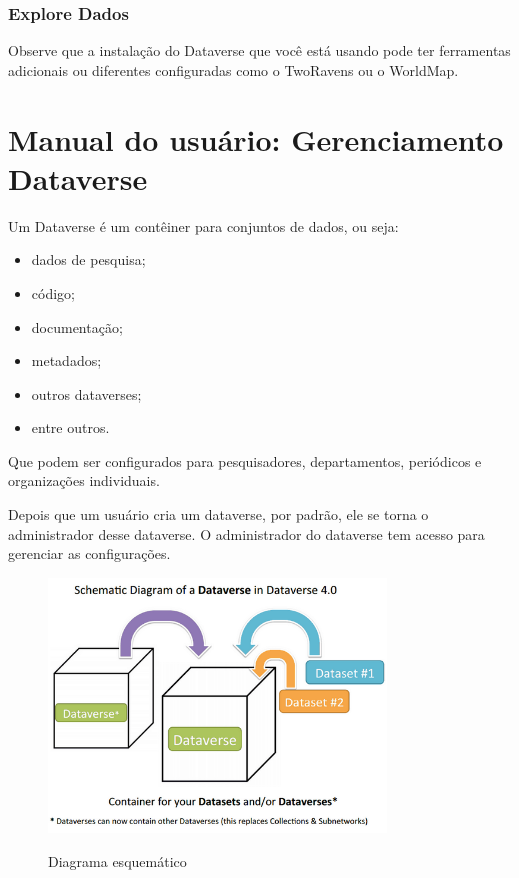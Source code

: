 \documentclass[12pt,hidelinks]{article}
\begin{document}
    	\subsubsection{Explore Dados}
	
\qquad Observe que a instalação do Dataverse que você está usando pode ter ferramentas adicionais ou diferentes configuradas como o TwoRavens ou o WorldMap.
	
\newpage

\section{Manual do usuário: Gerenciamento Dataverse}
\vspace{10.5cm}

\qquad Um Dataverse é um contêiner para conjuntos de dados, ou seja: 

\begin{itemize}
    \item dados de pesquisa;
    \item código;
    \item documentação;
    \item metadados;
    \item outros dataverses;
    \item entre outros.
\end{itemize}

Que podem ser configurados para pesquisadores, departamentos, periódicos e organizações individuais.

Depois que um usuário cria um dataverse, por padrão, ele se torna o administrador desse dataverse. O administrador do dataverse tem acesso para gerenciar as configurações.


\begin{figure}[H]
\caption{Diagrama esquemático}
\centering
    \includegraphics[width=0.8\textwidth]{imagens/Dataverse-Diagram.png}
    \label{Diagrama dataverse}
\end{figure}
\end{document}
